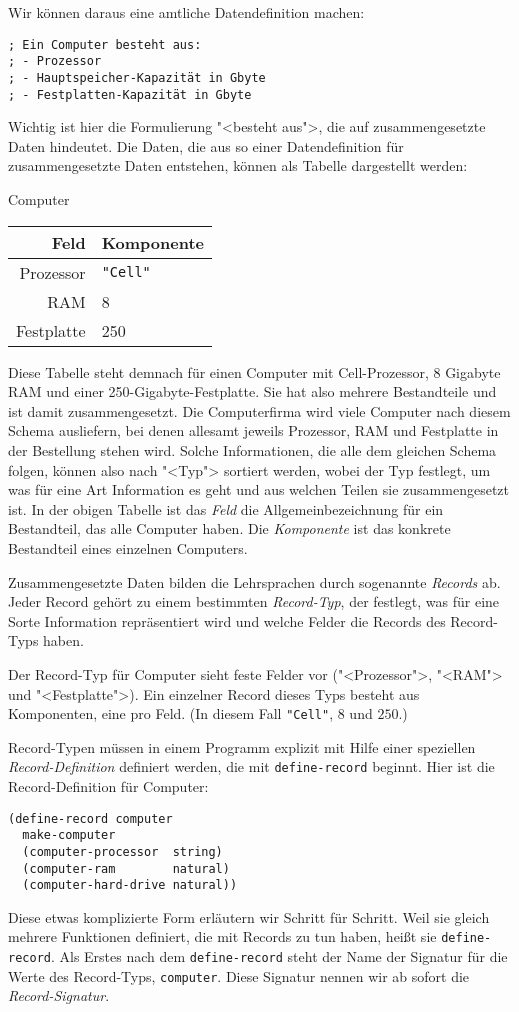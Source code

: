 Wir können daraus eine amtliche Datendefinition machen:
%
\begin{lstlisting}
; Ein Computer besteht aus:
; - Prozessor
; - Hauptspeicher-Kapazität in Gbyte
; - Festplatten-Kapazität in Gbyte
\end{lstlisting}
%
Wichtig ist hier die Formulierung "<besteht aus">, die auf
zusammengesetzte Daten hindeutet.  Die Daten, die aus so einer
Datendefinition für zusammengesetzte Daten entstehen, können als
Tabelle dargestellt werden:
%
\begin{center}
  Computer\qquad
  \begin{tabular}[c]{r|l}
    \textbf{Feld} & \textbf{Komponente}\\\hline
     Prozessor & \verb|"Cell"|\\
     RAM & 8\\
    Festplatte & 250
  \end{tabular}
\end{center}
%
Diese Tabelle steht demnach für einen Computer mit Cell-Prozessor, 8
Gigabyte RAM und einer 250-Gigabyte-Festplatte.  Sie hat also mehrere
Bestandteile und ist damit zusammengesetzt.  Die Computerfirma wird
viele Computer nach diesem Schema ausliefern, bei denen allesamt
jeweils Prozessor, RAM und Festplatte in der Bestellung stehen wird.  Solche
Informationen, die alle dem gleichen Schema folgen, können also nach
"<Typ"> sortiert werden, wobei der Typ
festlegt, um was für eine Art Information es geht und aus welchen
Teilen sie zusammengesetzt ist.  In der obigen Tabelle ist das
\textit{Feld} die Allgemeinbezeichnung für ein Bestandteil, das
alle Computer haben.  Die \textit{Komponente} ist das konkrete
Bestandteil eines einzelnen Computers.

Zusammengesetzte Daten bilden die Lehrsprachen durch
sogenannte \textit{Records} ab.  Jeder Record gehört
zu einem bestimmten
\textit{Record-Typ}, der festlegt, was für eine
Sorte Information repräsentiert wird und welche Felder die Records
des Record-Typs haben.

Der Record-Typ für Computer sieht feste Felder
vor ("<Prozessor">, "<RAM"> und "<Festplatte">).  Ein einzelner Record
dieses Typs besteht aus Komponenten, eine pro
Feld. (In diesem Fall \lstinline{"Cell"}, $8$ und $250$.)

Record-Typen müssen in einem Programm explizit mit Hilfe einer
speziellen \textit{Record-Definition} definiert werden, die mit
\lstinline{define-record} beginnt.  Hier ist die
Record-Definition für
Computer:
%
\begin{lstlisting}
(define-record computer
  make-computer
  (computer-processor  string)
  (computer-ram        natural)
  (computer-hard-drive natural))
\end{lstlisting}
%
Diese etwas komplizierte Form erläutern wir Schritt für Schritt.  Weil sie gleich mehrere
Funktionen definiert, die mit Records zu tun haben, heißt
sie \lstinline{define-record}.  Als Erstes nach
dem \lstinline{define-record} steht der Name der Signatur für
die Werte des Record-Typs,
\lstinline{computer}.  Diese Signatur nennen wir ab sofort die
\textit{Record-Signatur}.

